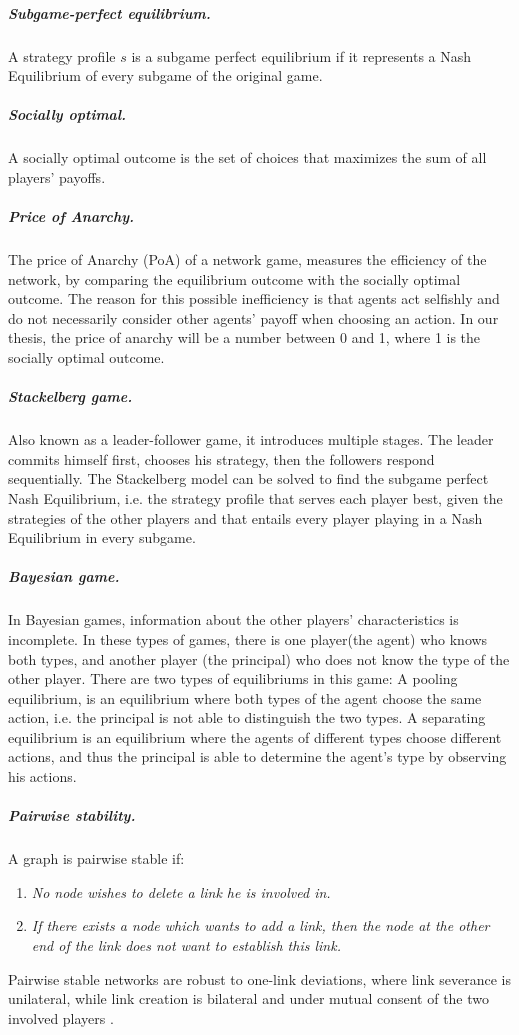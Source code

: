 \subparagraph{Subgame-perfect equilibrium.}
A strategy profile $s$ is a subgame perfect equilibrium if it represents a Nash Equilibrium of every subgame of the original game.
\subparagraph{Socially optimal.}
A socially optimal outcome is the set of choices that maximizes the sum of all players' payoffs. 
\subparagraph{Price of Anarchy.}
The price of Anarchy (PoA) of a network game, measures the efficiency of the network, by comparing the equilibrium outcome with the socially optimal outcome. The reason for this possible inefficiency is that agents act selfishly and do not necessarily consider other agents' payoff when choosing an action. In our thesis, the price of anarchy will be a number between 0 and 1, where 1 is the socially optimal outcome.
\subparagraph{Stackelberg game.}
Also known as a leader-follower game, it introduces multiple stages. The leader commits himself first, chooses his strategy, then the followers respond sequentially. The Stackelberg model can be solved to find the subgame perfect Nash Equilibrium, i.e. the strategy profile that serves each player best, given the strategies of the other players and that entails every player playing in a Nash Equilibrium in every subgame.
\subparagraph{Bayesian game.}
In Bayesian games, information about the other players' characteristics is incomplete. In these types of games, there is one player(the agent) who knows both types, and another player (the principal) who does not know the type of the other player. There are two types of equilibriums in this game:
A pooling equilibrium, is an equilibrium where both types of the agent choose the same action, i.e. the principal is not able to distinguish the two types. 
A separating equilibrium is an equilibrium where the agents of different types choose different actions, and thus the principal is able to determine the agent's type by observing his actions.
\subparagraph{Pairwise stability.}
A graph is pairwise stable if:
 \begin{enumerate}
\item \textit{No node wishes to delete a link he is involved in.}
\item \textit{If there exists a node which wants to add a link, then the node at the other end of the link does not want to establish this link.}
\end{enumerate} 
Pairwise stable networks are robust to one-link deviations, where link
severance is unilateral, while link creation is bilateral and under mutual consent of the two involved
players \cite{calvo2009pairwise}.

